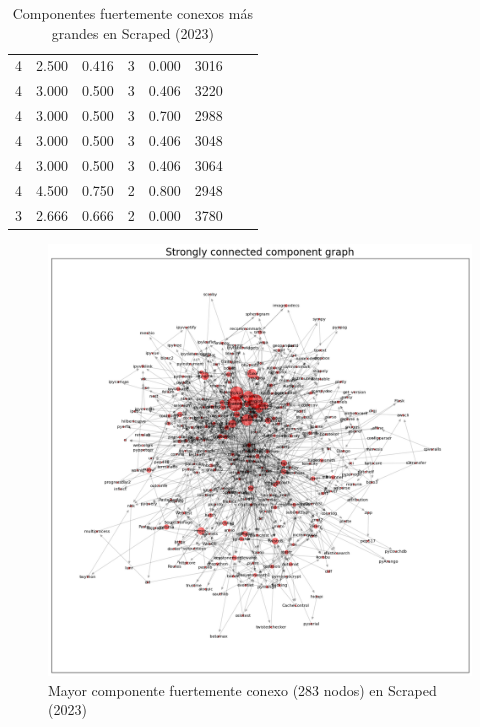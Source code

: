 \begin{table}[ht!]
\begin{tabular}{|c|c|c|c|c|c|c|c|}
        4             & 2.500           & 0.416            & 3                 & 0.000                & 3016                  \\
        4             & 3.000           & 0.500            & 3                 & 0.406                & 3220                  \\
        4             & 3.000           & 0.500            & 3                 & 0.700                & 2988                  \\
        4             & 3.000           & 0.500            & 3                 & 0.406                & 3048                  \\
        4             & 3.000           & 0.500            & 3                 & 0.406                & 3064                  \\
        4             & 4.500           & 0.750            & 2                 & 0.800                & 2948                  \\
        3             & 2.666           & 0.666            & 2                 & 0.000                & 3780                  \\
        \hline
    \end{tabular}
    \caption{Componentes fuertemente conexos más grandes en Scraped (2023)}
    \label{table:scc}
\end{table}

\begin{figure}[h!]
    \begin{center}
        \includegraphics[width=1\textwidth]{img/pypi/scc1.png}
        \caption{Mayor componente fuertemente conexo (283 nodos) en Scraped (2023)}
        \label{fig:scc1}
    \end{center}
\end{figure}

